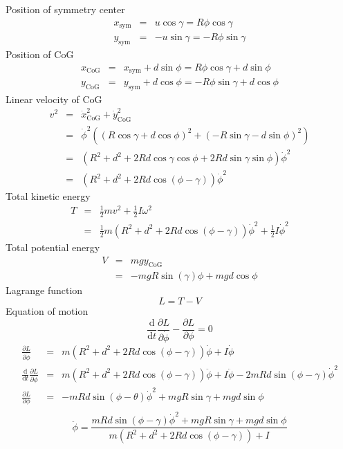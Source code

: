 \documentclass[a4paper]{article}
\begin{document}
\noindent Position of symmetry center
\begin{eqnarray*}
x_\mathrm{sym} &=& u \cos{\gamma} = R \phi \cos{\gamma}\\
y_\mathrm{sym} &=& -u \sin{\gamma} = -R \phi \sin{\gamma}
\end{eqnarray*}
Position of CoG
\begin{eqnarray*}
x_\mathrm{CoG} &=& x_\mathrm{sym} + d \sin{\phi} = R \phi \cos{\gamma} + d \sin{\phi}\\
y_\mathrm{CoG} &=& y_\mathrm{sym} + d \cos{\phi} = -R \phi \sin{\gamma} + d \cos{\phi}
\end{eqnarray*}
Linear velocity of CoG
\begin{eqnarray*}
v^2 &=& \dot{x}_\mathrm{CoG}^2 + \dot{y}_\mathrm{CoG}^2\\
&=& \dot{\phi}^2 \left( (R \cos{\gamma} + d \cos{\phi})^2 + (-R \sin{\gamma} - d \sin{\phi})^2 \right)\\
&=& (R^2 + d^2 + 2Rd \cos{\gamma} \cos{\phi} + 2Rd \sin{\gamma} \sin{\phi}) \dot{\phi}^2\\
&=& (R^2 + d^2 + 2Rd \cos(\phi - \gamma)) \dot{\phi}^2
\end{eqnarray*}
Total kinetic energy
\begin{eqnarray*}
T &=& \frac{1}{2} m v^2 + \frac{1}{2} I \omega^2\\
&=& \frac{1}{2} m (R^2 + d^2 + 2Rd \cos(\phi - \gamma)) \dot{\phi}^2
 + \frac{1}{2} I \dot{\phi}^2
\end{eqnarray*}
Total potential energy
\begin{eqnarray*}
V &=& mg y_\mathrm{CoG}\\
&=& -mgR \sin(\gamma) \phi + mgd \cos{\phi}
\end{eqnarray*}
Lagrange function
\begin{displaymath}
L = T - V
\end{displaymath}
Equation of motion
\begin{displaymath}
\frac{\mathrm{d}}{\mathrm{d}t} \frac{\partial L}{\partial \dot{\phi}}
- \frac{\partial L}{\partial \phi} = 0
\end{displaymath}
\begin{eqnarray*}
\frac{\partial L}{\partial \dot{\phi}} &=& m (R^2 + d^2 + 2Rd \cos(\phi - \gamma)) \dot{\phi} + I \dot{\phi}\\
\frac{\mathrm{d}}{\mathrm{d}t} \frac{\partial L}{\partial \dot{\phi}} &=&
m(R^2 + d^2 + 2Rd\cos(\phi - \gamma)) \ddot{\phi} + I \ddot{\phi}
- 2mRd \sin(\phi - \gamma) \dot{\phi}^2\\
\frac{\partial L}{\partial \phi} &=& -mRd \sin(\phi-\theta) \dot{\phi}^2
+ mgR \sin{\gamma} + mgd \sin{\phi}\\
\end{eqnarray*}
\begin{displaymath}
\ddot{\phi} = \frac{mRd \sin(\phi - \gamma) \dot{\phi}^2 + mgR \sin{\gamma} + mgd \sin{\phi}}
{m(R^2 + d^2 + 2Rd\cos(\phi - \gamma)) + I}
\end{displaymath}
\end{document}
